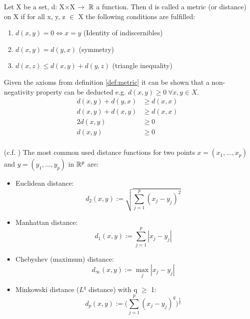 \begin{definition}\label{def:metric} Let X be a set, d: X$\times$X $\rightarrow~\mathbb{R}$ a function. Then d is called a metric (or distance) on X if for all x, y, z $\in$ X the following conditions are fulfilled: 
\begin{enumerate}[label=(\subscript{D}{\arabic*})]
	\item\label{itm:namee} $d(x,y) = 0 \Leftrightarrow x = y$ \hfill (Identity of indiscernibles)
	\item $d(x,y) = d(y,x)$  \hfill (symmetry)
	\item $d(x,z) \leq d(x,y) + d(y,z)$ \hfill (triangle inequality)
\end{enumerate}

\begin{remark}
	Given the axioms from definition \ref{def:metric} it can be shown that a non-negativity property can be deducted e.g. $d(x,y) \geq 0 ~\forall x,y \in X$.
	\begin{equation*}
	\begin{split}
		d(x,y) + d(y,x) & \geq d(x,x) \\
		d(x,y) + d(x,y) & \geq d(x,x) \\
		2d(x,y)         & \geq 0      \\
		d(x,y)          & \geq 0      \\
	\end{split}
	\end{equation*}
\end{remark}


\begin{example}(c.f. \cite{analysis_1}) The most common used distance functions for two points $x=(x_1, ..., x_p)$ and  $y=(y_1, ..., y_p)$ in $\mathbb{R}^p$ are: 
	\begin{itemize}[label=$\star$]
		\item Euclidean distance:
			\begin{equation*}
				d_2(x,y) := \sqrt{\sum_{j=1}^p(x_j - y_j)^2}
			\end{equation*}
		\item Manhattan distance:
			\begin{equation*}
				d_1(x,y) := \sum_{j=1}^p|x_j - y_j|
			\end{equation*}
		\item Chebyshev (maximum) distance:
			\begin{equation*}
				d_\infty(x,y) := \max_j|x_j - y_j|
			\end{equation*}		
		\item Minkowski distance ($L^q$ distance) with q $\geq$ 1:
			\begin{equation*}
				d_p(x,y) := \bigg(\sum_{j=1}^p(x_j - y_j)^q\bigg)^{\frac{1}{q}}
			\end{equation*}	
	\end{itemize}
\end{example}

\end{definition}
